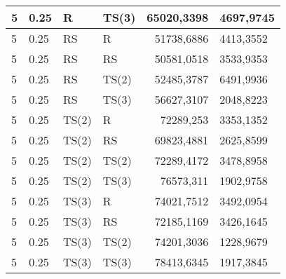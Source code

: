 \documentclass[twoside]{iisthesis}
\begin{document}
\begin{center}
\begin{longtable}{|l|l|l|l|r@{$\pm$}l|}
		5 & 0.25 & R & TS(3) & 65020,3398 & 4697,9745\\ \hline
		5 & 0.25 & RS & R & 51738,6886 & 4413,3552\\ \hline
		5 & 0.25 & RS & RS & 50581,0518 & 3533,9353\\ \hline
		5 & 0.25 & RS & TS(2) & 52485,3787 & 6491,9936\\ \hline
		5 & 0.25 & RS & TS(3) & 56627,3107 & 2048,8223\\ \hline
		5 & 0.25 & TS(2) & R & 72289,253 & 3353,1352\\ \hline
		5 & 0.25 & TS(2) & RS & 69823,4881 & 2625,8599\\ \hline
		5 & 0.25 & TS(2) & TS(2) & 72289,4172 & 3478,8958\\ \hline
		5 & 0.25 & TS(2) & TS(3) & 76573,311 & 1902,9758\\ \hline
		5 & 0.25 & TS(3) & R & 74021,7512 & 3492,0954\\ \hline
		5 & 0.25 & TS(3) & RS & 72185,1169 & 3426,1645\\ \hline
		5 & 0.25 & TS(3) & TS(2) & 74201,3036 & 1228,9679\\ \hline
		5 & 0.25 & TS(3) & TS(3) & 78413,6345 & 1917,3845\\ \hline
	\end{longtable}
\end{center}
\end{document}
